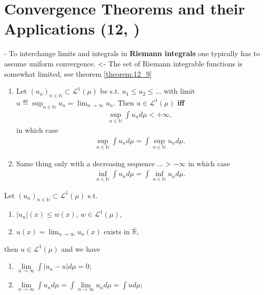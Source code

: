 \section{Convergence Theorems and their Applications \tiny{(12, \cite{schilling2017measures})}}
- To interchange limits and integrals in \textbf{Riemann integrals} one typically has to assume uniform convergence. <- The set of Riemann
integrable functions is somewhat limited, see theorem \ref{theorem:12_9}

\begin{theorem}
    \quad
    
    \begin{enumerate}[label=(\roman*)]
        \item Let \((u_n)_{n\in\mathbb{N}}\subset \mathcal{L}^{1}(\mu)\) be s.t. \(u_1\leq u_2 \leq ...\) with limit 
        \(u\eqdef \sup_{n\in\mathbb{N}}u_n = \lim_{n\rightarrow\infty} u_n\). Then \(u\in\mathcal{L}^{1}(\mu)\) \textbf{iff} 
        \begin{eqnarray*}
            \sup\limits_{n\in\mathbb{N}}\int u_nd\mu <+\infty,
        \end{eqnarray*}
        in which case
        \begin{eqnarray*}
            \sup\limits_{n\in\mathbb{N}}\int u_n d\mu = \int\sup\limits_{n\in\mathbb{N}}u_n d\mu.
        \end{eqnarray*}
        \item Same thing only with a decreasing sequence ...\(>-\infty\) in which case
        \begin{eqnarray*}
            \inf\limits_{n\in\mathbb{N}}\int u_n d\mu = \int\inf\limits_{n\in\mathbb{N}}u_n d\mu.
        \end{eqnarray*}
    \end{enumerate}
\end{theorem}

\begin{theorem}
    Let \((u_n)_{n\in\mathbb{N}}\subset\mathcal{L}^{1}(\mu)\) s.t.
    \begin{enumerate}[label=(\alph*)]
        \item \(|u_n|(x)\leq w(x)\), \(w\in\mathcal{L}^{1}(\mu)\),
        \item \(u(x) = \lim_{n\rightarrow\infty}u_n(x)\) exists in \(\bar{\mathbb{R}}\),
    \end{enumerate}
    then \(u\in\mathcal{L}^{1}(\mu)\) and we have
    \begin{enumerate}[label=(\roman*)]
        \item \(\lim\limits_{n\rightarrow\infty} \int \vert u_n - u\vert d\mu = 0\);
        \item \(\lim\limits_{n\rightarrow\infty} \int u_n d\mu = \int\lim\limits_{n\rightarrow\infty}u_n d\mu = \int ud\mu\);
    \end{enumerate}
\end{theorem}
\ifdetailed
